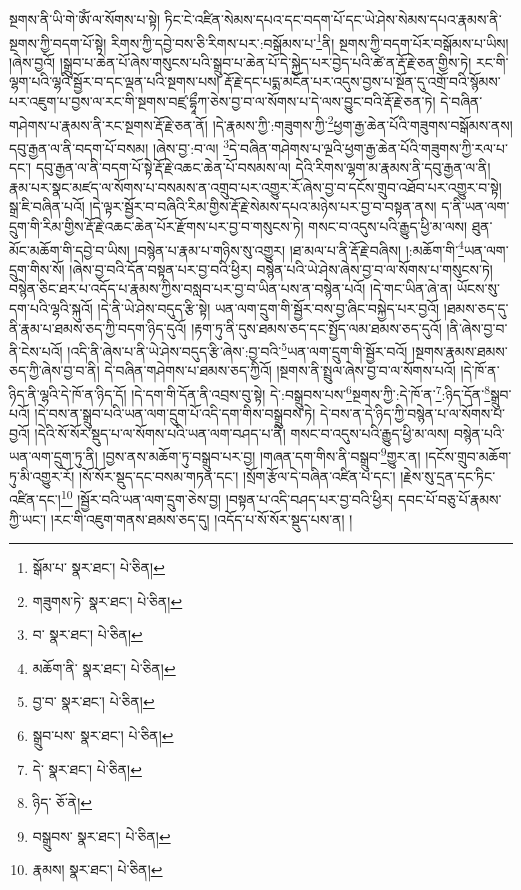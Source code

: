 སྔགས་ནི་ཡི་གེ་ཨོཾ་ལ་སོགས་པ་སྟེ། ཏིང་ངེ་འཛིན་སེམས་དཔའ་དང་བདག་པོ་དང་ཡེ་ཤེས་སེམས་དཔའ་རྣམས་ནི་སྔགས་ཀྱི་བདག་པོ་སྟེ། རིགས་ཀྱི་དབྱེ་བས་ཅི་རིགས་པར་:བསྒོམས་པ་\footnote{སྒོམ་པ་  སྣར་ཐང་།  པེ་ཅིན། }ནི། སྔགས་ཀྱི་བདག་པོར་བསྒོམས་པ་ཡིས། །ཞེས་བྱའོ། །སྒྲུབ་པ་ཆེན་པོ་ཞེས་གསུངས་པའི་སྒྲུབ་པ་ཆེན་པོ་དེ་སྐྱེད་པར་བྱེད་པའི་ཚེ་ན་རྡོ་རྗེ་ཅན་གྱིས་ཏེ། རང་གི་ལྷག་པའི་ལྷའི་སྦྱོར་བ་དང་ལྡན་པའི་སྔགས་པས། རྡོ་རྗེ་དང་པདྨ་མངོན་པར་འདུས་བྱས་པ་སྔོན་དུ་འགྲོ་བའི་སྙོམས་པར་འཇུག་པ་བྱས་ལ་རང་གི་སྔགས་བཛྲ་དྷཱྀཀ་ཅེས་བྱ་བ་ལ་སོགས་པ་དེ་ལས་བྱུང་བའི་རྡོ་རྗེ་ཅན་ཏེ། དེ་བཞིན་གཤེགས་པ་རྣམས་ནི་རང་སྔགས་རྡོ་རྗེ་ཅན་ནོ། །དེ་རྣམས་ཀྱི་:གཟུགས་ཀྱི་\footnote{གཟུགས་ཏེ་  སྣར་ཐང་།  པེ་ཅིན། }ཕྱག་རྒྱ་ཆེན་པོའི་གཟུགས་བསྒོམས་ནས། དབུ་རྒྱན་ལ་ནི་བདག་པོ་བསམ། །ཞེས་བྱ་:བ་ལ། \footnote{བ་  སྣར་ཐང་།  པེ་ཅིན། }དེ་བཞིན་གཤེགས་པ་ལྔའི་ཕྱག་རྒྱ་ཆེན་པོའི་གཟུགས་ཀྱི་རལ་པ་དང་། དབུ་རྒྱན་ལ་ནི་བདག་པོ་སྟེ་རྡོ་རྗེ་འཆང་ཆེན་པོ་བསམས་ལ། དེའི་རིགས་ལྷག་མ་རྣམས་ནི་དབུ་རྒྱན་ལ་ནི། རྣམ་པར་སྣང་མཛད་ལ་སོགས་པ་བསམས་ན་འགྲུབ་པར་འགྱུར་རོ་ཞེས་བྱ་བ་དངོས་གྲུབ་འཐོབ་པར་འགྱུར་བ་སྟེ། སྒྲ་ཇི་བཞིན་པའོ། །དེ་ལྟར་སྦྱོར་བ་བཞིའི་རིམ་གྱིས་རྡོ་རྗེ་སེམས་དཔའ་མཉེས་པར་བྱ་བ་བསྟན་ནས། ད་ནི་ཡན་ལག་དྲུག་གི་རིམ་གྱིས་རྡོ་རྗེ་འཆང་ཆེན་པོར་རྫོགས་པར་བྱ་བ་གསུངས་ཏེ། གསང་བ་འདུས་པའི་རྒྱུད་ཕྱི་མ་ལས། ཐུན་མོང་མཆོག་གི་དབྱེ་བ་ཡིས། །བསྙེན་པ་རྣམ་པ་གཉིས་སུ་འགྱུར། །ཐ་མལ་པ་ནི་རྡོ་རྗེ་བཞིས། །:མཆོག་གི་\footnote{མཆོག་ནི་  སྣར་ཐང་།  པེ་ཅིན། }ཡན་ལག་དྲུག་གིས་སོ། །ཞེས་བྱ་བའི་དོན་བསྟན་པར་བྱ་བའི་ཕྱིར། བསྙེན་པའི་ཡེ་ཤེས་ཞེས་བྱ་བ་ལ་སོགས་པ་གསུངས་ཏེ། བསྙེན་ཅིང་ཐར་པ་འདོད་པ་རྣམས་ཀྱིས་བསླབ་པར་བྱ་བ་ཡིན་པས་ན་བསྙེན་པའོ། །དེ་གང་ཡིན་ཞེ་ན། ཡོངས་སུ་དག་པའི་ལྷའི་སྐུའོ། །དེ་ནི་ཡེ་ཤེས་བདུད་རྩི་སྟེ། ཡན་ལག་དྲུག་གི་སྦྱོར་བས་བྱ་ཞིང་བསྐྱེད་པར་བྱའོ། །ཐམས་ཅད་དུ་ནི་རྣམ་པ་ཐམས་ཅད་ཀྱི་བདག་ཉིད་དུའོ། །རྟག་ཏུ་ནི་དུས་ཐམས་ཅད་དང་སྤྱོད་ལམ་ཐམས་ཅད་དུའོ། །ནི་ཞེས་བྱ་བ་ནི་ངེས་པའོ། །འདི་ནི་ཞེས་པ་ནི་ཡེ་ཤེས་བདུད་རྩི་ཞེས་:བྱ་བའི་\footnote{བྱ་བ་  སྣར་ཐང་།  པེ་ཅིན། }ཡན་ལག་དྲུག་གི་སྦྱོར་བའོ། །སྔགས་རྣམས་ཐམས་ཅད་ཀྱི་ཞེས་བྱ་བ་ནི། དེ་བཞིན་གཤེགས་པ་ཐམས་ཅད་ཀྱིའོ། །སྔགས་ནི་སྤྲུལ་ཞེས་བྱ་བ་ལ་སོགས་པའོ། །དེ་ཁོ་ན་ཉིད་ནི་ལྷའི་དེ་ཁོ་ན་ཉིད་དོ། །དེ་དག་གི་དོན་ནི་འབྲས་བུ་སྟེ། དེ་:བསྒྲུབས་པས་\footnote{སྒྲུབ་པས་  སྣར་ཐང་།  པེ་ཅིན། }སྔགས་ཀྱི་:དེ་ཁོ་ན་\footnote{དེ་  སྣར་ཐང་།  པེ་ཅིན། }:ཉིད་དོན་\footnote{ཉིད་  ཅོ་ནེ། }སྒྲུབ་པའོ། །དེ་བས་ན་སྒྲུབ་པའི་ཡན་ལག་དྲུག་པོ་འདི་དག་གིས་བསྒྲུབས་ཏེ། དེ་བས་ན་དེ་ཉིད་ཀྱི་བསྙེན་པ་ལ་སོགས་པ་བྱའོ། །དེའི་སོ་སོར་སྡུད་པ་ལ་སོགས་པའི་ཡན་ལག་བཤད་པ་ནི། གསང་བ་འདུས་པའི་རྒྱུད་ཕྱི་མ་ལས། བསྙེན་པའི་ཡན་ལག་དྲུག་ཏུ་ནི། །བྱས་ནས་མཆོག་ཏུ་བསྒྲུབ་པར་བྱ། །གཞན་དག་གིས་ནི་བསྒྲུབ་\footnote{བསྒྲུབས་  སྣར་ཐང་།  པེ་ཅིན། }གྱུར་ན། །དངོས་གྲུབ་མཆོག་ཏུ་མི་འགྱུར་རོ། །སོ་སོར་སྡུད་དང་བསམ་གཏན་དང་། །སྲོག་རྩོལ་དེ་བཞིན་འཛིན་པ་དང་། །རྗེས་སུ་དྲན་དང་ཏིང་འཛིན་དང་།\footnote{རྣམས།  སྣར་ཐང་།  པེ་ཅིན། } །སྦྱོར་བའི་ཡན་ལག་དྲུག་ཅེས་བྱ། །བསྟན་པ་འདི་བཤད་པར་བྱ་བའི་ཕྱིར། དབང་པོ་བཅུ་པོ་རྣམས་ཀྱི་ཡང་། །རང་གི་འཇུག་གནས་ཐམས་ཅད་དུ། །འདོད་པ་སོ་སོར་སྡུད་པས་ན། །
